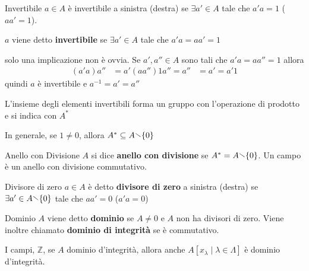 \begin{definition}{Invertibile}
    \(a \in A\) è invertibile a sinistra (destra) se \(\exists a' \in A\) tale
    che \(a' a = 1\) (\(a a' = 1\)).

    \(a\) viene detto \textbf{invertibile} se \(\exists a' \in A\) tale che \(a' a = aa' = 1\)
\end{definition}
\begin{remark}
    solo una implicazione non è ovvia. Se \(a', a'' \in A\) sono tali che \(a' a
    = a a'' = 1\) allora
    \begin{align*}
        {(a' a)}a'' &= a' (a a'') 
        1 a'' = a'' &= a' = a' 1
    \end{align*}
    quindi \(a\) è invertibile e \(a^{-1} = a' = a''\) 
\end{remark}


\begin{remark}
    L'insieme degli elementi invertibili forma un gruppo con l'operazione di
    prodotto e si indica con \(A^{*}\) 
\end{remark}

In generale, se \(1 \neq 0\), allora \(A^{*} \subseteq A \sminus \{0\}  \) 

\begin{definition}{Anello con Divisione}
    \(A\) si dice \textbf{anello con divisione} se \(A^{*} = A \sminus \{0\} \).
    Un campo è un anello con divisione commutativo.
\end{definition}

\begin{definition}{Divisore di zero}
    \(a \in A\) è detto \textbf{divisore di zero} a sinistra (destra) se \(\exists  a' \in A \sminus \{0\} \) tale che \(a a' = 0\) (\(a' a = 0\))
\end{definition}

\begin{definition}{Dominio}
    \(A\) viene detto \textbf{dominio} se \(A \neq 0\) e \(A\) non ha divisori
    di zero. Viene inoltre chiamato \textbf{dominio di integrità} se è
    commutativo.
\end{definition}
\begin{example}
    I campi, \(\mathbb{Z}\), se \(A\) dominio d'integrità, allora anche \(A[x_{\lambda} \mid \lambda \in \Lambda ]\) è dominio d'integrità.
\end{example}

